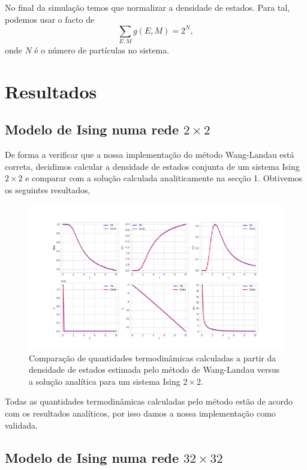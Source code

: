 \documentclass[12pt, a4paper]{article}
\begin{document}
No final da simulação temos que normalizar a densidade de estados. Para tal, podemos usar o facto de 
\begin{equation}
	\sum_{E,M} g(E,M) = 2^N,
\end{equation}
onde $N$ é o número de partículas no sistema.
	
	\pagebreak	
	
	\section{Resultados}
	
	\subsection{Modelo de Ising numa rede $2 \times 2$}	
	
	De forma a verificar que a nossa implementação do método Wang-Landau está correta, decidimos calcular a densidade de estados conjunta de um sistema Ising $2\times 2$ e comparar com a solução calculada analiticamente na secção 1.  Obtivemos os seguintes resultados,
	
	\begin{figure}[h]
		\centering
		\includegraphics[scale=0.4]{L2.png}
		\caption{Comparação de quantidades termodinâmicas calculadas a partir da densidade de estados estimada pelo método de Wang-Landau versus a solução analítica para um sistema Ising $2 \times 2$.}
		\label{L2}
	\end{figure}
	
	Todas as quantidades termodinâmicas calculadas pelo método estão de acordo com os resultados analíticos, por isso damos a nossa implementação como validada. 
	
	\subsection{Modelo de Ising numa rede $32 \times 32$}
	
\end{document}
